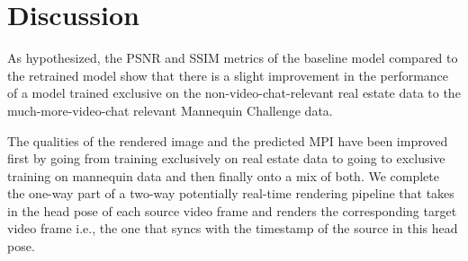 \chapter{Discussion}\label{ch:discussion}





As hypothesized, the PSNR and SSIM metrics of the baseline model compared to the retrained model show that there is a slight improvement in the performance of a model trained exclusive on the non-video-chat-relevant real estate data to the much-more-video-chat relevant Mannequin Challenge data. 

The qualities of the rendered image and the predicted MPI have been improved first by going from training exclusively on real estate data to going to exclusive training on mannequin data and then finally onto a mix of both. We complete the one-way part of a two-way potentially real-time rendering pipeline that takes in the head pose of each source video frame and renders the corresponding target video frame i.e., the one that syncs with the timestamp of the source in this head pose.


